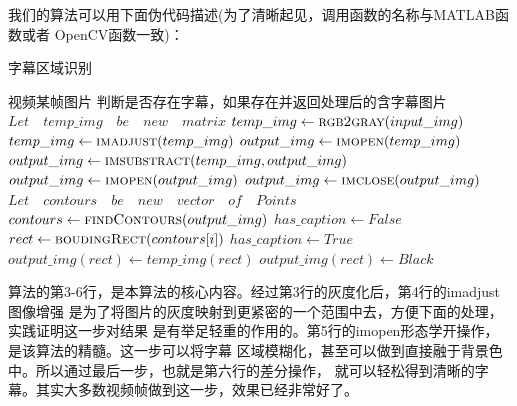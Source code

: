 \documentclass{article}
\begin{document}
                我们的算法可以用下面伪代码描述(为了清晰起见，调用函数的名称与MATLAB函数或者
                OpenCV函数一致)：
                \begin{algorithm}
                    \caption{字幕区域识别}
                    \begin{algorithmic}[1]
                        \Require 视频某帧图片
                        \Ensure 判断是否存在字幕，如果存在并返回处理后的含字幕图片
                            \State $Let\quad temp\_img\quad be\quad  new\quad  matrix$
                            \State $temp\_img \gets \Call{rgb2gray}{input\_img}$
                            \State $temp\_img \gets \Call{imadjust}{temp\_img}$
                            \State $output\_img \gets \Call{imopen}{temp\_img}$
                            \State $output\_img \gets \Call{imsubstract}{temp\_img, output\_img}$
                            \State $output\_img \gets \Call{imopen}{output\_img}$
                            \State $output\_img \gets \Call{imclose}{output\_img}$
                            \State $Let\quad contours\quad be\quad new\quad vector\quad of\quad Points$
                            \State $contours \gets \Call{findContours}{output\_img} $
                            \State $has\_caption \gets False$
                                \State $rect \gets \Call{boudingRect}{contours[i]}$
                                    \State $has\_caption \gets True$
                                    \State $ output\_img(rect) \gets temp\_img(rect) $
                                \Else
                                    \State $ output\_img(rect) \gets Black$
                                \EndIf
                            \EndFor
                            \State {} 
                        \EndFunction
                    \end{algorithmic}
                \end{algorithm}


                算法的第3-6行，是本算法的核心内容。经过第3行的灰度化后，第4行的imadjust图像增强
                是为了将图片的灰度映射到更紧密的一个范围中去，方便下面的处理，实践证明这一步对结果
                是有举足轻重的作用的。第5行的imopen形态学开操作，是该算法的精髓。这一步可以将字幕
                区域模糊化，甚至可以做到直接融于背景色中。所以通过最后一步，也就是第六行的差分操作，
                就可以轻松得到清晰的字幕。其实大多数视频帧做到这一步，效果已经非常好了。
\end{document}
